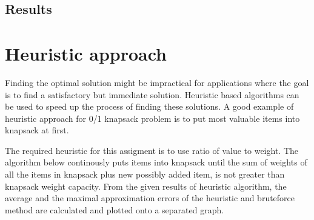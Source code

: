 \documentclass{article}
\begin{document}
		\subsection{Results}

\begin{figure}[h!]
\centering
{}
\medskip

\end{figure}

	
	\section{Heuristic approach}
		Finding the optimal solution might be impractical for applications where the goal is to find a satisfactory but immediate solution. 
		Heuristic based algorithms can be used to speed up the process of finding these solutions.
		A good example of heuristic approach for 0/1 knapsack problem is to put most valuable items into knapsack at first.
		
		The required heuristic for this assigment is to use ratio of value to weight.
		The algorithm below continously puts items into knapsack until the sum of weights of all the items in knapsack plus new possibly added item, is not greater than knapsack weight capacity.
		From the given results of heuristic algorithm, the average and the maximal approximation errors of the heuristic and bruteforce method are calculated and plotted onto a separated graph.
\end{document}
